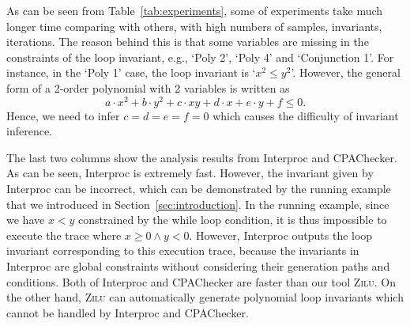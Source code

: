 As can be seen from Table~\ref{tab:experiments}, 
some of experiments take much longer time comparing with others, 
with high numbers of samples, invariants, iterations. 
The reason behind this is 
that some variables are missing in the constraints of the loop invariant, 
e.g., `Poly 2', `Poly 4' and `Conjunction 1'.  
For instance, in the `Poly 1' case, the loop invariant is `$x^2 \le y^2$'. 
However, the general form of a 2-order polynomial with 2 variables 
is written as 
\[
    a \cdot x^2 + b \cdot y^2 + c \cdot x y + d \cdot x + e \cdot y + f \le 0. 
\] 
Hence, we need to infer $c = d = e = f = 0$ 
which causes the difficulty of invariant inference. 

The last two columns show the analysis results from Interproc and CPAChecker. 
As can be seen, Interproc is extremely fast. 
However, the invariant given by Interproc can be incorrect, 
which can be demonstrated by the running example 
that we introduced in Section~\ref{sec:introduction}. 
In the running example, since we have $x < y$ constrained by the while loop condition, 
it is thus impossible to execute the trace where $x \ge 0 \land y < 0$. 
However, Interproc outputs the loop invariant corresponding to this execution trace, 
because the invariants in Interproc are global constraints 
without considering their generation paths and conditions. 
Both of Interproc and CPAChecker are faster than our tool \textsc{Zilu}. 
On the other hand, \textsc{Zilu} can automatically generate polynomial loop invariants 
which cannot be handled by Interproc and CPAChecker. 




